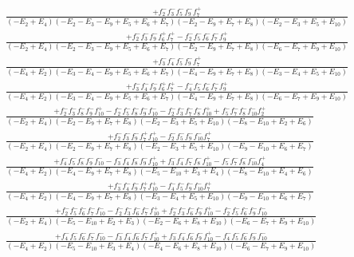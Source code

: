\documentclass{article}
\begin{document}
\[\begin{array}{rcl}
\frac{+f_{2}^{-}f_{3}^{-}f_{5}^{-}f_{9}^{-}f_{7}^{+}}{(-E_{2}+E_{4})(-E_{2}-E_{3}-E_{9}+E_{5}+E_{6}+E_{7})(-E_{2}-E_{9}+E_{7}+E_{8})(-E_{2}-E_{3}+E_{5}+E_{10})}\\
\frac{+f_{2}^{-}f_{3}^{-}f_{9}^{-}f_{6}^{+}f_{7}^{+}-f_{2}^{-}f_{5}^{-}f_{6}^{-}f_{7}^{-}f_{9}^{+}}{(-E_{2}+E_{4})(-E_{2}-E_{3}-E_{9}+E_{5}+E_{6}+E_{7})(-E_{2}-E_{9}+E_{7}+E_{8})(-E_{6}-E_{7}+E_{9}+E_{10})}\\
\frac{+f_{3}^{-}f_{4}^{-}f_{5}^{-}f_{9}^{-}f_{7}^{+}}{(-E_{4}+E_{2})(-E_{3}-E_{4}-E_{9}+E_{5}+E_{6}+E_{7})(-E_{4}-E_{9}+E_{7}+E_{8})(-E_{3}-E_{4}+E_{5}+E_{10})}\\
\frac{+f_{3}^{-}f_{4}^{-}f_{9}^{-}f_{6}^{+}f_{7}^{+}-f_{4}^{-}f_{5}^{-}f_{6}^{-}f_{7}^{-}f_{9}^{+}}{(-E_{4}+E_{2})(-E_{3}-E_{4}-E_{9}+E_{5}+E_{6}+E_{7})(-E_{4}-E_{9}+E_{7}+E_{8})(-E_{6}-E_{7}+E_{9}+E_{10})}\\
\frac{+f_{2}^{-}f_{3}^{-}f_{8}^{-}f_{9}^{-}f_{10}^{+}-f_{2}^{-}f_{5}^{-}f_{8}^{-}f_{9}^{-}f_{10}^{-}-f_{2}^{-}f_{3}^{-}f_{7}^{-}f_{8}^{-}f_{10}^{+}+f_{5}^{-}f_{7}^{-}f_{8}^{-}f_{10}^{-}f_{2}^{+}}{(-E_{2}+E_{4})(-E_{2}-E_{9}+E_{7}+E_{8})(-E_{2}-E_{3}+E_{5}+E_{10})(-E_{8}-E_{10}+E_{2}+E_{6})}\\
\frac{+f_{2}^{-}f_{3}^{-}f_{9}^{-}f_{7}^{+}f_{10}^{+}-f_{2}^{-}f_{5}^{-}f_{9}^{-}f_{10}^{-}f_{7}^{+}}{(-E_{2}+E_{4})(-E_{2}-E_{9}+E_{7}+E_{8})(-E_{2}-E_{3}+E_{5}+E_{10})(-E_{9}-E_{10}+E_{6}+E_{7})}\\
\frac{+f_{4}^{-}f_{5}^{-}f_{8}^{-}f_{9}^{-}f_{10}^{-}-f_{3}^{-}f_{4}^{-}f_{8}^{-}f_{9}^{-}f_{10}^{+}+f_{3}^{-}f_{4}^{-}f_{7}^{-}f_{8}^{-}f_{10}^{+}-f_{5}^{-}f_{7}^{-}f_{8}^{-}f_{10}^{-}f_{4}^{+}}{(-E_{4}+E_{2})(-E_{4}-E_{9}+E_{7}+E_{8})(-E_{5}-E_{10}+E_{3}+E_{4})(-E_{8}-E_{10}+E_{4}+E_{6})}\\
\frac{+f_{3}^{-}f_{4}^{-}f_{9}^{-}f_{7}^{+}f_{10}^{+}-f_{4}^{-}f_{5}^{-}f_{9}^{-}f_{10}^{-}f_{7}^{+}}{(-E_{4}+E_{2})(-E_{4}-E_{9}+E_{7}+E_{8})(-E_{3}-E_{4}+E_{5}+E_{10})(-E_{9}-E_{10}+E_{6}+E_{7})}\\
\frac{+f_{2}^{-}f_{5}^{-}f_{6}^{-}f_{7}^{-}f_{10}^{-}-f_{2}^{-}f_{3}^{-}f_{6}^{-}f_{7}^{-}f_{10}^{+}+f_{2}^{-}f_{3}^{-}f_{6}^{-}f_{9}^{-}f_{10}^{+}-f_{2}^{-}f_{5}^{-}f_{6}^{-}f_{9}^{-}f_{10}^{-}}{(-E_{2}+E_{4})(-E_{5}-E_{10}+E_{2}+E_{3})(-E_{2}-E_{6}+E_{8}+E_{10})(-E_{6}-E_{7}+E_{9}+E_{10})}\\
\frac{+f_{4}^{-}f_{5}^{-}f_{6}^{-}f_{7}^{-}f_{10}^{-}-f_{3}^{-}f_{4}^{-}f_{6}^{-}f_{7}^{-}f_{10}^{+}+f_{3}^{-}f_{4}^{-}f_{6}^{-}f_{9}^{-}f_{10}^{+}-f_{4}^{-}f_{5}^{-}f_{6}^{-}f_{9}^{-}f_{10}^{-}}{(-E_{4}+E_{2})(-E_{5}-E_{10}+E_{3}+E_{4})(-E_{4}-E_{6}+E_{8}+E_{10})(-E_{6}-E_{7}+E_{9}+E_{10})}\\

\end{array}\]
\end{document}

